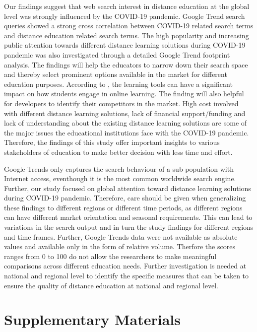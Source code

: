 \documentclass[11pt,a4paper,]{article}
\begin{document}
Our findings suggest that web search interest in distance education at the global level was strongly influenced by the COVID-19 pandemic. Google Trend search queries showed a strong cross correlation between COVID-19 related search terms and distance education related search terms. The high popularity and increasing public attention towards different distance learning solutions during COVID-19 pandemic was also investigated through a detailed Google Trend footprint analysis. The findings will help the educators to narrow down their search space and thereby select prominent options available in the market for different education purposes. According to \textcite{wallace2003online}, the learning tools can have a significant impact on how students engage in online learning. The finding will also helpful for developers to identify their competitors in the market. High cost involved with different distance learning solutions, lack of financial support/funding and lack of understanding about the existing distance learning solutions are some of the major issues the educational institutions face with the COVID-19 pandemic. Therefore, the findings of this study offer important insights to various stakeholders of education to make better decision with less time and effort.

Google Trends only captures the search behaviour of a sub population with Internet access, eventhough it is the most common worldwide search engine. Further, our study focused on global attention toward distance learning solutions during COVID-19 pandemic. Therefore, care should be given when generalizing these findings to different regions or different time periods, as different regions can have different market orientation and seasonal requirements. This can lead to variations in the search output and in turn the study findings for different regions and time frames. Further, Google Trends data were not available as absolute values and available only in the form of relative volume. Therfore the scores ranges from 0 to 100 do not allow the researchers to make meaningful comparisons across different education needs. Further investigation is needed at national and regional level to identify the specific measures that can be taken to ensure the quality of distance education at national and regional level.

\hypertarget{supplementary-materials}{%
\section*{Supplementary Materials}\label{supplementary-materials}}
\end{document}
